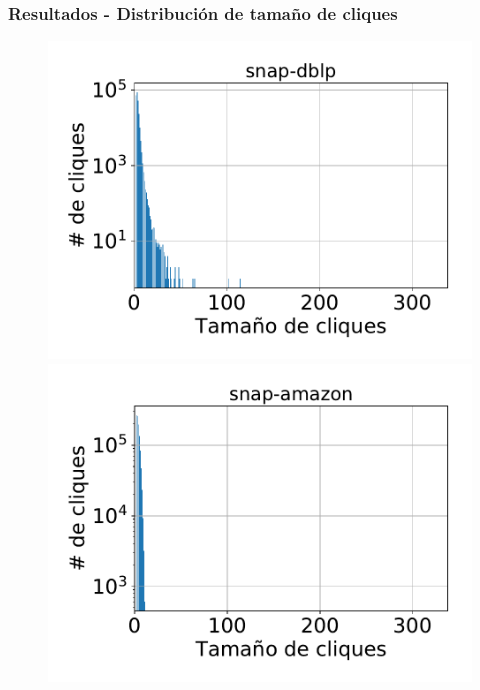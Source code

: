 \begin{frame}%
\frametitle{Resultados - Distribución de tamaño de cliques}

\begin{figure}
    \centering
    	\begin{minipage}{1\textwidth}
    		\centering
    		\begin{minipage}{0.45\textwidth}
    			\centering
    			\includegraphics[width=1\linewidth]{../img/cliqueDist2/snap-dblp.pdf}
    		\end{minipage}
    		\begin{minipage}{0.45\textwidth}
    			\centering
    			\includegraphics[width=1\linewidth]{../img/cliqueDist2/snap-amazon.pdf}
    		\end{minipage}  		
    	\end{minipage}
    	

\end{figure}
\end{frame}

